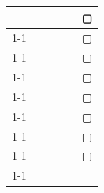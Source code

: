 \documentclass[paper=a4, fontsize=10bp]{jlreq}
\begin{document}
\begin{table}[H]
\begin{minipage}[h]{0.4\linewidth}
\begin{tabular}{cccccc}
            \multicolumn{1}{|c|}{} & & \multicolumn{1}{|c|}{} & & \multicolumn{1}{|c|}{} & ▢  \\ \cline{1-1} \cline{3-3} \cline{5-5}
            \multicolumn{1}{|c|}{} & & \multicolumn{1}{|c|}{} & & \multicolumn{1}{|c|}{} & ▢  \\ \cline{1-1} \cline{3-3} \cline{5-5}
            \multicolumn{1}{|c|}{} & & \multicolumn{1}{|c|}{} & & \multicolumn{1}{|c|}{} & ▢  \\ \cline{1-1} \cline{3-3} \cline{5-5}
            \multicolumn{1}{|c|}{} & & \multicolumn{1}{|c|}{} & & \multicolumn{1}{|c|}{} & ▢  \\ \cline{1-1} \cline{3-3} \cline{5-5}
            \multicolumn{1}{|c|}{} & & \multicolumn{1}{|c|}{} & & \multicolumn{1}{|c|}{} & ▢  \\ \cline{1-1} \cline{3-3} \cline{5-5}
            \multicolumn{1}{|c|}{} & & \multicolumn{1}{|c|}{} & & \multicolumn{1}{|c|}{} & ▢  \\ \cline{1-1} \cline{3-3} \cline{5-5}
            \multicolumn{1}{|c|}{} & & \multicolumn{1}{|c|}{} & & \multicolumn{1}{|c|}{} & ▢  \\ \cline{1-1} \cline{3-3} \cline{5-5}
            \multicolumn{1}{|c|}{} & & \multicolumn{1}{|c|}{} & & \multicolumn{1}{|c|}{} & ▢  \\ \cline{1-1} \cline{3-3} \cline{5-5}
        \end{tabular}
    \end{minipage}
\end{table}
\end{document}
